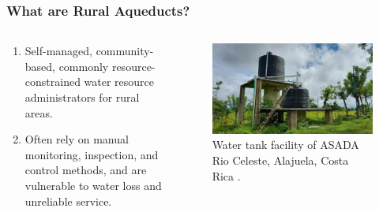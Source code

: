 \documentclass{beamer}
\begin{document}
\begin{frame}
    \frametitle{What are Rural Aqueducts?}

    \begin{columns}[T] %
        \begin{column}{0.5\textwidth}
            \begin{enumerate}
                \item Self-managed, community-based, commonly resource-constrained water resource administrators for rural areas.
                \item Often rely on manual monitoring, inspection, and control methods, and are vulnerable to water loss and unreliable service.
            \end{enumerate}
        \end{column}
        \begin{column}{0.5\textwidth}
            \begin{figure}
                \includegraphics[width=\columnwidth]{images/asada.jpg}
                \caption{Water tank facility of ASADA Rio Celeste, Alajuela, Costa Rica \cite{rioceleste}.}
            \end{figure}
        \end{column}
    \end{columns}
\end{frame}
\end{document}
